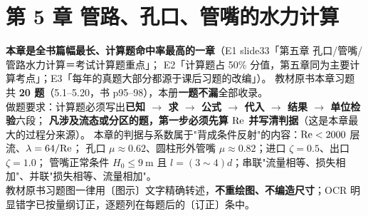 \chapter*{第 5 章 管路、孔口、管嘴的水力计算}

\begin{tishi}
\textbf{本章是全书篇幅最长、计算题命中率最高的一章}（E1 slide33「第五章 孔口/管嘴/管路水力计算＝考试计算题重点」；
E2「计算题占 50\% 分值，第五章同为主要计算考点」；E3「每年的真题大部分都源于课后习题的改编」）。
教材原书本章习题共 \textbf{20 题}（5.1--5.20，书 p95--98），本册\textbf{一题不漏}全部收录。\\
做题要求：计算题必须写出\textbf{已知 $\to$ 求 $\to$ 公式 $\to$ 代入 $\to$ 结果 $\to$ 单位检验}六段；
\textbf{凡涉及流态或分区的题，第一步必须先算 $\mathrm{Re}$ 并写清判据}（这是本章最大的过程分来源）。
本章的判据与系数属于"背成条件反射"的内容：$\mathrm{Re}<2000$ 层流、$\lambda=64/\mathrm{Re}$；
孔口 $\mu\approx0.62$、圆柱形外管嘴 $\mu\approx0.82$；进口 $\zeta=0.5$、出口 $\zeta=1.0$；
管嘴正常条件 $H_0\le9\ \mathrm{m}$ 且 $l=(3\sim4)d$；串联"流量相等、损失相加"、并联"损失相等、流量相加"。\\
教材原书习题图一律用〔图示〕文字精确转述，\textbf{不重绘图、不编造尺寸}；OCR 明显错字已按量纲订正，逐题列在每题后的〔订正〕条中。
\end{tishi}

